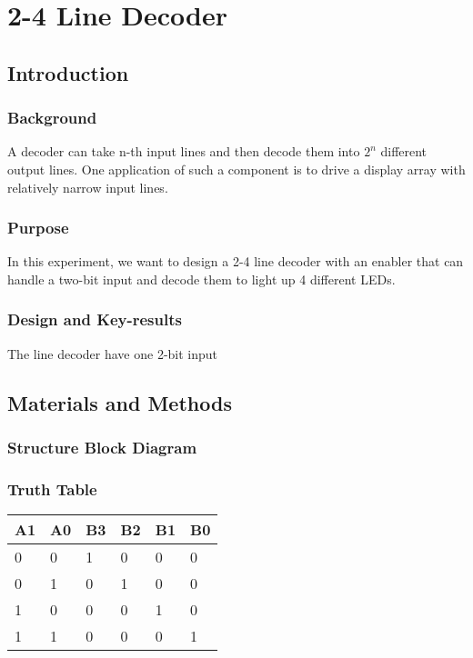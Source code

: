 \section{2-4 Line Decoder}
\subsection{Introduction}%
    \subsubsection{Background}
    A decoder can take n-th input lines and then decode them into 
    $2^n$ different output lines. 
    One application of such a component is to drive a display array with relatively
    narrow input lines.
    \subsubsection{Purpose}
    In this experiment, we want to design a 2-4 line decoder with an enabler 
    that can handle a two-bit input and decode them to light up 4 different LEDs.
    \subsubsection{Design and Key-results}
    The line decoder have one 2-bit input 
\subsection{Materials and Methods}%
    \subsubsection{Structure Block Diagram}
    \subsubsection{Truth Table}
    \begin{table}[h]
    \centering
        \begin{tabular}{|l|l|l|l|l|l|}
        \hline
        A1 & A0 & B3 & B2 & B1 & B0 \\ \hline
        0  & 0  & 1  & 0  & 0  & 0  \\ \hline
        0  & 1  & 0  & 1  & 0  & 0  \\ \hline
        1  & 0  & 0  & 0  & 1  & 0  \\ \hline
        1  & 1  & 0  & 0  & 0  & 1  \\ \hline
        \end{tabular}
    \end{table}
    \FloatBarrier
